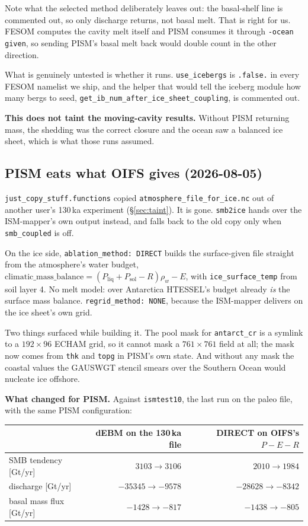 \documentclass[11pt,a4paper]{article}
\newcommand{\code}[1]{\texttt{\small #1}}
\begin{document}
Note what the selected method deliberately leaves out: the basal-shelf line is commented out, so
only discharge returns, not basal melt. That is right for us. FESOM computes the cavity melt
itself and PISM consumes it through \code{-ocean given}, so sending PISM's basal melt back would
double count in the other direction.

What is genuinely untested is whether it runs. \code{use\_icebergs} is \code{.false.} in every
FESOM namelist we ship, and the helper that would tell the iceberg module how many bergs to seed,
\code{get\_ib\_num\_after\_ice\_sheet\_coupling}, is commented out.

\medskip\noindent
\textbf{This does not taint the moving-cavity results.} Without PISM returning mass, the shedding
was the correct closure and the ocean saw a balanced ice sheet, which is what those runs assumed.

\subsection{PISM eats what OIFS gives (2026-08-05)}
\label{sec:direct}

\code{just\_copy\_stuff.functions} copied \code{atmosphere\_file\_for\_ice.nc} out of another
user's 130\,ka experiment (\S\ref{sec:taint}). It is gone. \code{smb2ice} hands over the
ISM-mapper's own output instead, and falls back to the old copy only when \code{smb\_coupled} is
off.

On the ice side, \code{ablation\_method: DIRECT} builds the surface-given file straight from the
atmosphere's water budget, $\mathrm{climatic\_mass\_balance} = (P_{\text{liq}}+P_{\text{sol}}-R)\rho_w - E$,
with \code{ice\_surface\_temp} from soil layer 4. No melt model: over Antarctica HTESSEL's budget
already \emph{is} the surface mass balance. \code{regrid\_method: NONE}, because the ISM-mapper
delivers on the ice sheet's own grid.

Two things surfaced while building it. The pool mask for \code{antarct\_cr} is a symlink to a
$192\times96$ ECHAM grid, so it cannot mask a $761\times761$ field at all; the mask now comes from
\code{thk} and \code{topg} in PISM's own state. And without any mask the coastal values the
GAUSWGT stencil smears over the Southern Ocean would nucleate ice offshore.

\medskip\noindent
\textbf{What changed for PISM.} Against \code{ismtest10}, the last run on the paleo file, with the
same PISM configuration:

\begin{center}
\begin{tabular}{@{}lrr@{}}
\toprule
 & dEBM on the 130\,ka file & DIRECT on OIFS's $P-E-R$ \\
\midrule
SMB tendency [Gt/yr]    & $3103 \to 3106$   & $2010 \to 1984$ \\
discharge [Gt/yr]       & $-35345 \to -9578$ & $-28628 \to -8342$ \\
basal mass flux [Gt/yr] & $-1428 \to -817$  & $-1438 \to -805$ \\
\bottomrule
\end{tabular}
\end{center}
\end{document}

